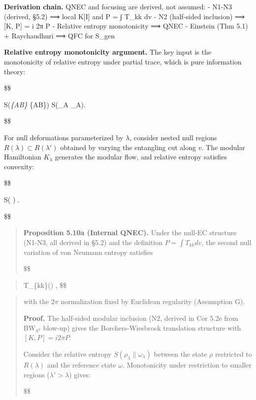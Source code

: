 \documentclass[11pt,a4paper]{article}
\theoremstyle{remark}
\begin{document}
\textbf{Derivation chain.} QNEC and focusing are derived, not assumed:
- N1-N3 (derived, §5.2) ⟹ local K{[}I{]} and P = ∫ T\_kk dv
- N2 (half-sided inclusion) ⟹ {[}K, P{]} = i 2π P
- Relative entropy monotonicity ⟹ QNEC
- Einstein (Thm 5.1) + Raychaudhuri ⟹ QFC for S\_gen

\textbf{Relative entropy monotonicity argument.} The key input is the monotonicity
of relative entropy under partial trace, which is pure information theory:

\$\$

S(\rho\emph{\{AB\} \textbar{} \sigma}\{AB\}) \ge S(\rho\_A \textbar{} \sigma\_A).

\$\$

For null deformations parameterized by \(\lambda\), consider nested null regions
\(R(\lambda) \subset R(\lambda')\) obtained by varying the entangling cut along
\(v\). The modular Hamiltonian \(K_\lambda\) generates the modular flow, and
relative entropy satisfies convexity:

\$\$

 S(\rho\emph{\lambda \textbar{} \sigma}\lambda) .

\$\$

\begin{quote}
\textbf{Proposition 5.10a (Internal QNEC).} Under the null-EC structure (N1-N3,
all derived in §5.2) and the definition \(P = \int T_{kk} dv\), the second
null variation of von Neumann entropy satisfies

\$\$
\end{quote}

\begin{quote}
 \pi \langle T\_\{kk\}(\lambda) \rangle,
\$\$
\end{quote}

\begin{quote}
with the \(2\pi\) normalization fixed by Euclidean regularity (Assumption G).

\textbf{Proof.} The half-sided modular inclusion (N2, derived in Cor 5.2e from
BW\(_{S^2}\) blow-up) gives the Borchers-Wiesbrock translation structure with
\([K, P] = i 2\pi P\).

Consider the relative entropy \(S(\rho_\lambda \| \omega_\lambda)\) between the
state \(\rho\) restricted to \(R(\lambda)\) and the reference state \(\omega\).
Monotonicity under restriction to smaller regions (\(\lambda' > \lambda\)) gives:

\$\$
\end{quote}
\end{document}
